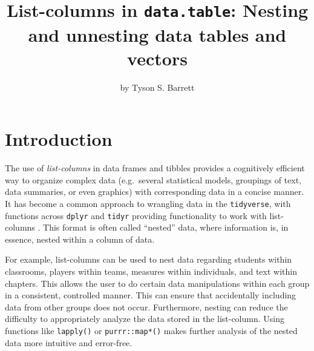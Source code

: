 \title{List-columns in \texttt{data.table}: Nesting and unnesting data tables
and vectors}
\author{by Tyson S. Barrett}

\maketitle



\hypertarget{introduction}{%
\section{Introduction}\label{introduction}}

The use of \emph{list-columns} in data frames and tibbles provides a
cognitively efficient way to organize complex data (e.g.~several
statistical models, groupings of text, data summaries, or even graphics)
with corresponding data in a concise manner. It has become a common
approach to wrangling data in the \texttt{tidyverse}, with functions
across \texttt{dplyr} and \texttt{tidyr} providing functionality to work
with list-columns \citep{R-dplyr,R-tidyr,jenny}. This format is often
called ``nested'' data, where information is, in essence, nested within
a column of data.

For example, list-columns can be used to nest data regarding students
within classrooms, players within teams, measures within individuals,
and text within chapters. This allows the user to do certain data
manipulations within each group in a consistent, controlled manner. This
can ensure that accidentally including data from other groups does not
occur. Furthermore, nesting can reduce the difficulty to appropriately
analyze the data stored in the list-column. Using functions like
\texttt{lapply()} or \texttt{purrr::map*()} makes further analysis of
the nested data more intuitive and error-free.

